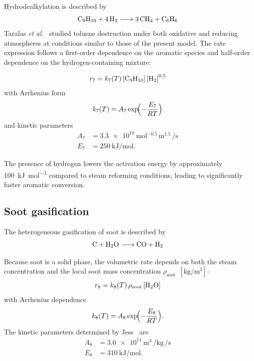 Hydrodealkylation is described by
%
\begin{equation}
  \ce{C9H10 + 4 H2 -> 3 CH4 + C6H6}
  \label{eq:rxn7}
\end{equation}
%
Taralas \textit{et al.}~\cite{Taralas2003} studied toluene destruction under both oxidative and reducing atmospheres at conditions similar to those of the present model. The rate expression follows a first-order dependence on the aromatic species and half-order dependence on the hydrogen-containing mixture:

%
\begin{equation}
  r_7 = k_7(T)\,[\ce{C9H10}]\,{[\ce{H2}]}^{0.5}
  \label{eq:rate7}
\end{equation}
%
with Arrhenius form
%
\begin{equation}
  k_7(T) = A_7 \exp\!\Bigl(-\frac{E_7}{RT}\Bigr)
  \label{eq:k7}
\end{equation}
%
and kinetic parameters
%
\begin{align}
  A_7 &= \SI{3.3e10}{\mole^{-0.5}\,\metre^{1.5}\,\per\second} \label{eq:A7} \\
  E_7 &= \SI{250}{\kilo\joule\per\mole}. \label{eq:E7}
\end{align}

The presence of hydrogen lowers the activation energy by approximately \SI{100}{\kilo\joule\per\mole} compared to steam reforming conditions, leading to significantly faster aromatic conversion.

\subsection{Soot gasification}\label{ssec:soot_gasification}

The heterogeneous gasification of soot is described by
%
\begin{equation}
  \ce{C + H2O -> CO + H2}
  \label{eq:rxn8}
\end{equation}

Because soot is a solid phase, the volumetric rate depends on both the steam concentration and the local soot mass concentration \(\rho_{\mathrm{soot}}\)~\([\si{\kilogram\per\metre\cubed}]\):
%
\begin{equation}
  r_8 = k_8(T)\,\rho_{\mathrm{soot}}\,[\ce{H2O}]
  \label{eq:rate8}
\end{equation}
%
with Arrhenius dependence
%
\begin{equation}
  k_8(T) = A_8 \exp\!\Bigl(-\frac{E_8}{RT}\Bigr).
  \label{eq:k8}
\end{equation}
%
The kinetic parameters determined by Jess~\cite{Jess1996} are
%
\begin{align}
  A_8 &= \SI{3.0e11}{\metre\cubed\,\per\kilogram\,\per\second} \label{eq:A8} \\
  E_8 &= \SI{310}{\kilo\joule\per\mole}. \label{eq:E8}
\end{align}

